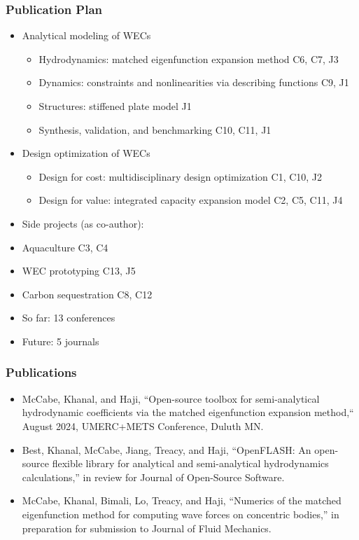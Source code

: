 \begin{frame}
	\frametitle{Publication Plan}
	\begin{itemize}
		\item Analytical modeling of WECs
		      \begin{itemize}
		      	\item Hydrodynamics: matched eigenfunction expansion method C6, C7, J3
		      	\item Dynamics: constraints and nonlinearities via describing functions C9, J1
		      	\item Structures: stiffened plate model J1
		      	\item Synthesis, validation, and benchmarking C10, C11, J1
		      \end{itemize}
		\item Design optimization of WECs
		      \begin{itemize}
		      	\item Design for cost: multidisciplinary design optimization C1, C10, J2
		      	\item Design for value: integrated capacity expansion model C2, C5, C11, J4
		      \end{itemize}
		      
		\item Side projects (as co-author):
		\item Aquaculture C3, C4
		\item WEC prototyping C13, J5
		\item Carbon sequestration C8, C12
		      
		\item So far: 13 conferences
		\item Future: 5 journals
	\end{itemize}
	
\end{frame}


\begin{frame}
	\frametitle{Publications}
	\begin{itemize}
		\item McCabe, Khanal, and Haji, “Open-source toolbox for semi-analytical hydrodynamic coefficients via the matched eigenfunction expansion method,“ August 2024, UMERC+METS Conference, Duluth MN.
		\item Best, Khanal, McCabe, Jiang, Treacy, and Haji, “OpenFLASH: An open-source flexible library for analytical and semi-analytical hydrodynamics calculations,” in review for Journal of Open-Source Software.
		\item McCabe, Khanal, Bimali, Lo, Treacy, and Haji, “Numerics of the matched eigenfunction method for computing wave forces on concentric bodies,” in preparation for submission to Journal of Fluid Mechanics.
	\end{itemize}
\end{frame}


